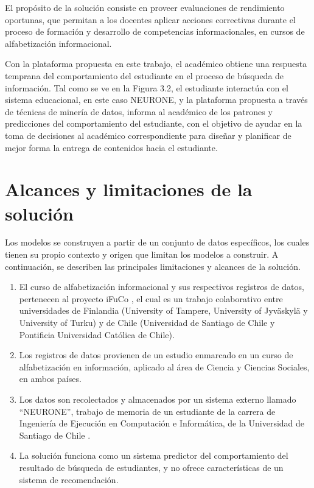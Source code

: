 El propósito de la solución consiste en proveer evaluaciones de rendimiento oportunas, que permitan a los docentes aplicar acciones correctivas durante el proceso de formación y desarrollo de competencias informacionales, en cursos de alfabetización informacional.

Con la plataforma propuesta en este trabajo, el académico obtiene una respuesta temprana del comportamiento del estudiante en el proceso de búsqueda de información. Tal como se ve en la Figura 3.2, el estudiante interactúa con el sistema educacional, en este caso NEURONE, y la plataforma propuesta a través de técnicas de minería de datos, informa al académico de los patrones y predicciones del comportamiento del estudiante, con el objetivo de ayudar en la toma de decisiones al académico correspondiente para diseñar y planificar de mejor forma la entrega de contenidos hacia el estudiante.

\section{Alcances y limitaciones de la solución}
Los modelos se construyen a partir de un conjunto de datos específicos, los cuales tienen su propio contexto y origen que limitan los modelos a construir. A continuación, se describen las principales limitaciones y alcances de la solución.

\begin{enumerate}
	\item El curso de alfabetización informacional y sus respectivos registros de datos, pertenecen al proyecto iFuCo \cite{CONICYT2015-listadoproyectos}, el cual es un trabajo colaborativo entre universidades de Finlandia (University of Tampere, University of  Jyväskylä y University of Turku) y de Chile (Universidad de Santiago de Chile y Pontificia Universidad Católica de Chile). 
	\item Los registros de datos provienen de un estudio enmarcado en un curso de alfabetización en información, aplicado al área de Ciencia y Ciencias Sociales, en ambos países.
	\item Los datos son recolectados y almacenados por un sistema externo llamado “NEURONE”, trabajo de memoria de un estudiante de la carrera de Ingeniería de Ejecución en Computación e Informática, de la Universidad de Santiago de Chile \cite{NEURONE2016}.
	\item La solución funciona como un sistema predictor del comportamiento del resultado de búsqueda de estudiantes, y no ofrece características de un sistema de recomendación.
\end{enumerate}
